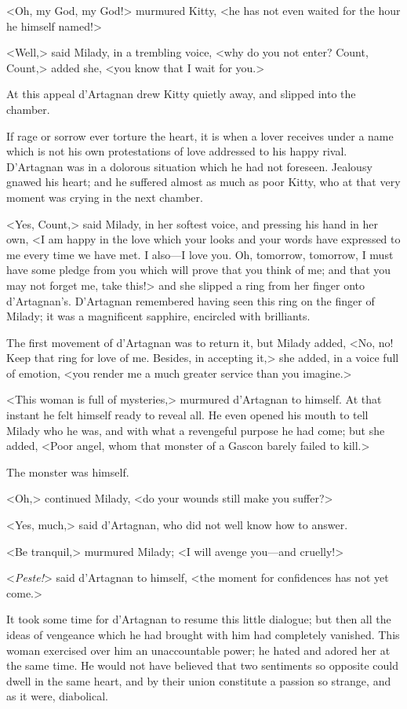 <Oh, my God, my God!> murmured Kitty, <he has not even waited for the hour he himself named!> 

<Well,> said Milady, in a trembling voice, <why do you not enter? Count, Count,> added she, <you know that I wait for you.> 

At this appeal d'Artagnan drew Kitty quietly away, and slipped into the chamber. 

If rage or sorrow ever torture the heart, it is when a lover receives under a name which is not his own protestations of love addressed to his happy rival. D'Artagnan was in a dolorous situation which he had not foreseen. Jealousy gnawed his heart; and he suffered almost as much as poor Kitty, who at that very moment was crying in the next chamber. 

<Yes, Count,> said Milady, in her softest voice, and pressing his hand in her own, <I am happy in the love which your looks and your words have expressed to me every time we have met. I also---I love you. Oh, tomorrow, tomorrow, I must have some pledge from you which will prove that you think of me; and that you may not forget me, take this!> and she slipped a ring from her finger onto d'Artagnan's. D'Artagnan remembered having seen this ring on the finger of Milady; it was a magnificent sapphire, encircled with brilliants. 

The first movement of d'Artagnan was to return it, but Milady added, <No, no! Keep that ring for love of me. Besides, in accepting it,> she added, in a voice full of emotion, <you render me a much greater service than you imagine.> 

<This woman is full of mysteries,> murmured d'Artagnan to himself. At that instant he felt himself ready to reveal all. He even opened his mouth to tell Milady who he was, and with what a revengeful purpose he had come; but she added, <Poor angel, whom that monster of a Gascon barely failed to kill.> 

The monster was himself. 

<Oh,> continued Milady, <do your wounds still make you suffer?> 

<Yes, much,> said d'Artagnan, who did not well know how to answer. 

<Be tranquil,> murmured Milady; <I will avenge you---and cruelly!> 

<\textit{Peste!}> said d'Artagnan to himself, <the moment for confidences has not yet come.> 

It took some time for d'Artagnan to resume this little dialogue; but then all the ideas of vengeance which he had brought with him had completely vanished. This woman exercised over him an unaccountable power; he hated and adored her at the same time. He would not have believed that two sentiments so opposite could dwell in the same heart, and by their union constitute a passion so strange, and as it were, diabolical. 

